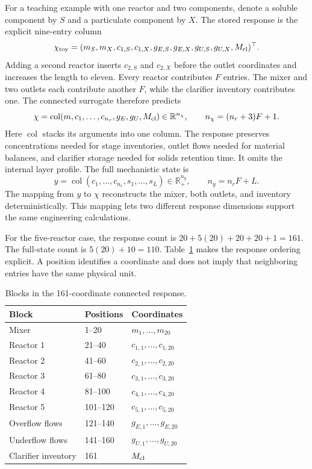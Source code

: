 For a teaching example with one reactor and two components, denote a soluble component by $S$ and a particulate component by $X$. The stored response is the explicit nine-entry column
\begin{equation}
\chi_{\rm toy}=
(m_S,m_X,c_{1,S},c_{1,X},g_{E,S},g_{E,X},g_{U,S},g_{U,X},M_{\rm cl})^\top.
\end{equation}
Adding a second reactor inserts $c_{2,S}$ and $c_{2,X}$ before the outlet coordinates and increases the length to eleven. Every reactor contributes $F$ entries. The mixer and two outlets each contribute another $F$, while the clarifier inventory contributes one. The connected surrogate therefore predicts
\begin{equation}
\chi=\operatorname{col}(m,c_1,\ldots,c_{n_r},g_E,g_U,M_{\rm cl})
\in\mathbb R^{n_\chi},\qquad n_\chi=(n_r+3)F+1.
\label{eq:plant_joint_response}
\end{equation}
Here $\operatorname{col}$ stacks its arguments into one column. The response preserves concentrations needed for stage inventories, outlet flows needed for material balances, and clarifier storage needed for solids retention time. It omits the internal layer profile. The full mechanistic state is
\begin{equation}
y=\operatorname{col}(c_1,\ldots,c_{n_r},s_1,\ldots,s_L)
\in\mathbb R_+^{n_y},\qquad n_y=n_rF+L.
\label{eq:plant_mechanistic_state}
\end{equation}
The mapping from $y$ to $\chi$ reconstructs the mixer, both outlets, and inventory deterministically. This mapping lets two different response dimensions support the same engineering calculations.

For the five-reactor case, the response count is $20+5(20)+20+20+1=161$. The full-state count is $5(20)+10=110$. Table~\ref{tab:plant_response_positions} makes the response ordering explicit. A position identifies a coordinate and does not imply that neighboring entries have the same physical unit.

\begin{table}[htbp]
\centering\small
\caption{Blocks in the 161-coordinate connected response.}
\label{tab:plant_response_positions}
\begin{tabular}{lll}
\toprule Block & Positions & Coordinates\\\midrule
Mixer & 1--20 & $m_1,\ldots,m_{20}$\\
Reactor 1 & 21--40 & $c_{1,1},\ldots,c_{1,20}$\\
Reactor 2 & 41--60 & $c_{2,1},\ldots,c_{2,20}$\\
Reactor 3 & 61--80 & $c_{3,1},\ldots,c_{3,20}$\\
Reactor 4 & 81--100 & $c_{4,1},\ldots,c_{4,20}$\\
Reactor 5 & 101--120 & $c_{5,1},\ldots,c_{5,20}$\\
Overflow flows & 121--140 & $g_{E,1},\ldots,g_{E,20}$\\
Underflow flows & 141--160 & $g_{U,1},\ldots,g_{U,20}$\\
Clarifier inventory & 161 & $M_{\rm cl}$\\
\bottomrule
\end{tabular}
\end{table}

